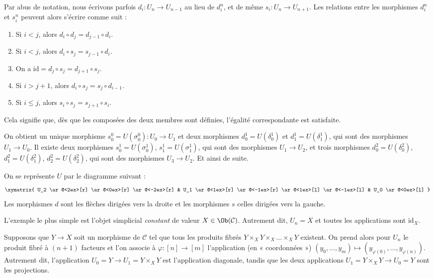 \begin{remark}
\label{remark-relations}
Par abus de notation, nous écrivons parfois $d_i : U_n \to U_{n - 1}$
au lieu de $d^n_i$, et de même $s_i : U_n \to U_{n + 1}$.
Les relations entre les morphismes $d^n_i$ et $s^n_i$
peuvent alors s'écrire comme suit :
\begin{enumerate}
\item Si $i < j$, alors $d_i \circ d_j = d_{j - 1} \circ d_i$.
\item Si $i < j$, alors $d_i \circ s_j = s_{j - 1} \circ d_i$.
\item On a $\text{id} = d_j \circ s_j = d_{j + 1} \circ s_j$.
\item Si $i > j + 1$, alors $d_i \circ s_j = s_j \circ d_{i - 1}$.
\item Si $i \leq j$, alors $s_i \circ s_j = s_{j + 1} \circ s_i$.
\end{enumerate}
Cela signifie que, dès que les composées des deux membres sont définies,
l'égalité correspondante est satisfaite.
\end{remark}

\noindent
On obtient un unique morphisme $s^0_0 = U(\sigma^0_0) : U_0 \to U_1$ et
deux morphismes $d^1_0 = U(\delta^1_0)$ et
$d^1_1 = U(\delta^1_1)$, qui sont des morphismes $U_1 \to U_0$.
Il existe deux morphismes $s^1_0 = U(\sigma^1_0)$,
$s^1_1 = U(\sigma^1_1)$, qui sont des morphismes $U_1 \to U_2$,
et trois morphismes
$d^2_0 = U(\delta^2_0)$, $d^2_1 = U(\delta^2_1)$,
$d^2_2 = U(\delta^2_2)$, qui sont des morphismes $U_3 \to U_2$.
Et ainsi de suite.

\medskip\noindent
On se représente $U$ par le diagramme suivant :
$$
\xymatrix{
U_2
\ar@<2ex>[r]
\ar@<0ex>[r]
\ar@<-2ex>[r]
&
U_1
\ar@<1ex>[r]
\ar@<-1ex>[r]
\ar@<1ex>[l]
\ar@<-1ex>[l]
&
U_0
\ar@<0ex>[l]
}
$$
Les morphismes $d$ sont les flèches dirigées vers la droite et les
morphismes $s$ celles dirigées vers la gauche.

\begin{example}
\label{example-constant-simplicial-object}
L'exemple le plus simple est l'objet simplicial {\it constant} de valeur
$X \in \Ob(\mathcal{C})$. Autrement dit, $U_n = X$ et toutes les
applications sont $\text{id}_X$.
\end{example}

\begin{example}
\label{example-fibre-products-simplicial-object}
Supposons que $Y\to X$ soit un morphisme de $\mathcal{C}$ tel que tous les
produits fibrés $Y \times_X Y \times_X \ldots \times_X Y$ existent.
On prend alors pour $U_n$ le produit fibré à $(n + 1)$ facteurs et l'on
associe à $\varphi : [n] \to [m]$ l'application (en « coordonnées »)
$(y_0, \ldots, y_m) \mapsto (y_{\varphi(0)}, \ldots, y_{\varphi(n)})$.
Autrement dit, l'application $U_0 = Y \to U_1 = Y \times_X Y$ est
l'application diagonale, tandis que les deux applications
$U_1 = Y \times_X Y \to U_0 = Y$ sont les projections.
\end{example}

